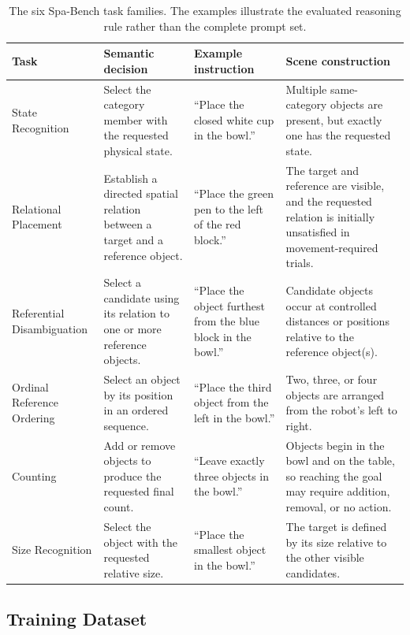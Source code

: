 \begin{table}[t]
\centering
\small
\setlength{\tabcolsep}{4pt}
\caption{The six Spa-Bench task families. The examples illustrate the evaluated reasoning rule rather than the complete prompt set.}
\label{tab:benchmark_tasks}
\begin{tabular}{p{} p{} p{} p{}}
\toprule
\textbf{Task} & \textbf{Semantic decision} & \textbf{Example instruction} & \textbf{Scene construction} \\
\midrule
State Recognition
& Select the category member with the requested physical state.
& ``Place the closed white cup in the bowl.''
& Multiple same-category objects are present, but exactly one has the requested state. \\

Relational Placement
& Establish a directed spatial relation between a target and a reference object.
& ``Place the green pen to the left of the red block.''
& The target and reference are visible, and the requested relation is initially unsatisfied in movement-required trials. \\

Referential Disambiguation
& Select a candidate using its relation to one or more reference objects.
& ``Place the object furthest from the blue block in the bowl.''
& Candidate objects occur at controlled distances or positions relative to the reference object(s). \\

Ordinal Reference Ordering
& Select an object by its position in an ordered sequence.
& ``Place the third object from the left in the bowl.''
& Two, three, or four objects are arranged from the robot's left to right. \\

Counting
& Add or remove objects to produce the requested final count.
& ``Leave exactly three objects in the bowl.''
& Objects begin in the bowl and on the table, so reaching the goal may require addition, removal, or no action. \\

Size Recognition
& Select the object with the requested relative size.
& ``Place the smallest object in the bowl.''
& The target is defined by its size relative to the other visible candidates. \\
\bottomrule
\end{tabular}
\end{table}

\subsection{Training Dataset}

